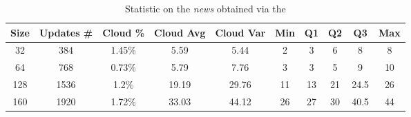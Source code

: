 \begin{table}[h!]
  \hspace{-30pt}
  \begin{tabular}{|c|c|c|c|c|c|c|c|c|c|}
  \hline
  Size & Updates \# & Cloud \% & Cloud Avg & Cloud Var & Min & Q1 & Q2 & Q3 & Max\\
  \hline
  \hline
  32 & 384 & 1.45\%  & 5.59 & 5.44 & 2 & 3 & 6 & 8 & 8 \\
  64 & 768 & 0.73\% & 5.79 & 7.76 & 3 & 3 & 5 & 9 & 10 \\
  128 & 1536 & 1.2\% & 19.19 & 29.76 & 11 & 13 & 21 & 24.5 & 26\\
  160 & 1920 & 1.72\% &33.03 & 44.12 & 26 & 27 & 30 & 40.5 & 44 \\
  \hline
  \end{tabular}
  \caption{Statistic on the \textit{news} obtained via the \cloud}
  \label{tbl:cloud-news}
\end{table}
